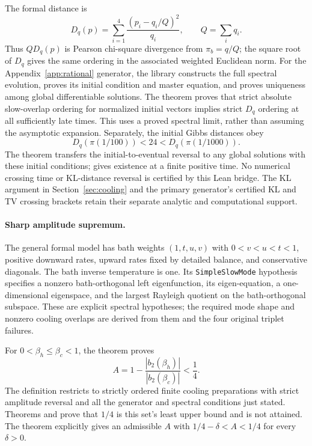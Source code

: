 \documentclass[11pt]{article}
\begin{document}
The formal distance is
\begin{equation}\label{eq:lean-distance}
 D_q(p)=\sum_{i=1}^4\frac{(p_i-q_i/Q)^2}{q_i},\qquad Q=\sum_iq_i.
\end{equation}
Thus $Q D_q(p)$ is Pearson chi-square divergence from $\pi_b=q/Q$;
the square root of $D_q$ gives the same ordering in the associated weighted
Euclidean norm. For the Appendix~\ref{app:rational} generator, the library constructs the
full spectral evolution, proves its initial condition and master equation,
and proves uniqueness among global differentiable solutions. The theorem
 proves that strict
absolute slow-overlap ordering for normalized initial vectors implies strict
$D_q$ ordering at all sufficiently late times. This uses a proved spectral
limit, rather than assuming the asymptotic expansion.
Separately, the initial Gibbs distances obey
\[
 D_q(\pi(1/100))<24<D_q(\pi(1/1000)).
\]
The theorem  transfers the
initial-to-eventual reversal to any global solutions with these initial
conditions;  gives existence
at a finite positive time. No numerical crossing time or KL-distance
reversal is certified by this Lean bridge. The KL argument in
Section~\ref{sec:cooling} and the primary generator's certified KL and TV
crossing brackets retain their separate analytic and computational support.

\paragraph{Sharp amplitude supremum.}
The general formal model has bath weights $(1,t,u,v)$ with
$0<v<u<t<1$, positive downward rates, upward rates fixed by detailed balance,
and conservative diagonals. The bath inverse temperature is one.
Its \texttt{SimpleSlowMode} hypothesis specifies a nonzero bath-orthogonal
left eigenfunction, its eigen-equation, a one-dimensional eigenspace, and
the largest Rayleigh quotient on the bath-orthogonal subspace. These are
explicit spectral hypotheses; the required mode shape and nonzero cooling
overlaps are derived from them and the four original triplet failures.

For $0<\beta_h\leq\beta_c<1$, the theorem
proves
\[
 A=1-\frac{|b_2(\beta_h)|}{|b_2(\beta_c)|}<\frac14.
\]
The definition  restricts to
strictly ordered finite cooling preparations with strict amplitude reversal
and all the generator and spectral conditions just stated.
Theorems  and
 prove that $1/4$ is this
set's least upper bound and is not attained. The theorem
 explicitly gives
an admissible $A$ with $1/4-\delta<A<1/4$ for every $\delta>0$.
\end{document}
